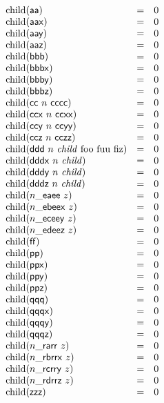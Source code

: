 $$
\begin{array}{@{}lcl@{}l@{}}
{\mathrm{child}}(\mathsf{aa}) &=& 0 \\
{\mathrm{child}}(\mathsf{aax}) &=& 0 \\
{\mathrm{child}}(\mathsf{aay}) &=& 0 \\
{\mathrm{child}}(\mathsf{aaz}) &=& 0 \\
{\mathrm{child}}(\mathsf{bbb}) &=& 0 \\
{\mathrm{child}}(\mathsf{bbbx}) &=& 0 \\
{\mathrm{child}}(\mathsf{bbby}) &=& 0 \\
{\mathrm{child}}(\mathsf{bbbz}) &=& 0 \\
{\mathrm{child}}(\mathsf{cc}~n~\mathsf{cccc}) &=& 0 \\
{\mathrm{child}}(\mathsf{ccx}~n~\mathsf{ccxx}) &=& 0 \\
{\mathrm{child}}(\mathsf{ccy}~n~\mathsf{ccyy}) &=& 0 \\
{\mathrm{child}}(\mathsf{ccz}~n~\mathsf{cczz}) &=& 0 \\
{\mathrm{child}}(\mathsf{ddd}~n~{\mathit{child}}~{\mathrm{foo}}~{\mathrm{fuu}}~{\mathrm{fiz}}) &=& 0 \\
{\mathrm{child}}(\mathsf{dddx}~n~{\mathit{child}}) &=& 0 \\
{\mathrm{child}}(\mathsf{dddy}~n~{\mathit{child}}) &=& 0 \\
{\mathrm{child}}(\mathsf{dddz}~n~{\mathit{child}}) &=& 0 \\
{\mathrm{child}}({n}{\mathsf{\_}}{\mathsf{ea}}{\mathsf{ee}}~z) &=& 0 \\
{\mathrm{child}}({n}{\mathsf{\_}}{\mathsf{eb}}{\mathsf{eex}}~z) &=& 0 \\
{\mathrm{child}}({n}{\mathsf{\_}}{\mathsf{ec}}{\mathsf{eey}}~z) &=& 0 \\
{\mathrm{child}}({n}{\mathsf{\_}}{\mathsf{ed}}{\mathsf{eez}}~z) &=& 0 \\
{\mathrm{child}}(\mathsf{ff}) &=& 0 \\
{\mathrm{child}}(\mathsf{pp}) &=& 0 \\
{\mathrm{child}}(\mathsf{ppx}) &=& 0 \\
{\mathrm{child}}(\mathsf{ppy}) &=& 0 \\
{\mathrm{child}}(\mathsf{ppz}) &=& 0 \\
{\mathrm{child}}(\mathsf{qqq}) &=& 0 \\
{\mathrm{child}}(\mathsf{qqqx}) &=& 0 \\
{\mathrm{child}}(\mathsf{qqqy}) &=& 0 \\
{\mathrm{child}}(\mathsf{qqqz}) &=& 0 \\
{\mathrm{child}}({n}{\mathsf{\_}}{\mathsf{ra}}{\mathsf{rr}}~z) &=& 0 \\
{\mathrm{child}}({n}{\mathsf{\_}}{\mathsf{rb}}{\mathsf{rrx}}~z) &=& 0 \\
{\mathrm{child}}({n}{\mathsf{\_}}{\mathsf{rc}}{\mathsf{rry}}~z) &=& 0 \\
{\mathrm{child}}({n}{\mathsf{\_}}{\mathsf{rd}}{\mathsf{rrz}}~z) &=& 0 \\
{\mathrm{child}}(\mathsf{zzz}) &=& 0 \\
\end{array}
$$

